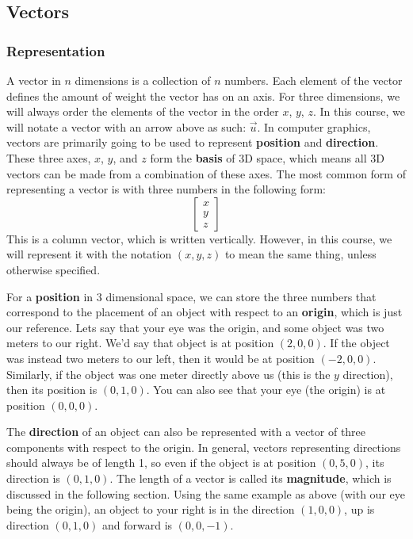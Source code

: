 \documentclass[a4paper]{article}
\begin{document}
\subsection{Vectors}

\subsubsection{Representation}
A vector in $n$ dimensions is a collection of $n$ numbers. Each element of the vector defines the amount of weight the vector has on an axis. For three dimensions, we will always order the elements of the vector in the order $x$, $y$, $z$. In this course, we will notate a vector with an arrow above as such: $\vec u$. In computer graphics, vectors are primarily going to be used to represent \textbf{position} and \textbf{direction}. These three axes, $x$, $y$, and $z$ form the \textbf{basis} of 3D space, which means all 3D vectors can be made from a combination of these axes. The most common form of representing a vector is with three numbers in the following form:
\[
\begin{bmatrix}
x \\
y \\
z 
\end{bmatrix}
\]
This is a column vector, which is written vertically. However, in this course, we will represent it with the notation $(x, y, z)$ to mean the same thing, unless otherwise specified.

For a \textbf{position} in 3 dimensional space, we can store the three numbers that correspond to the placement of an object with respect to an \textbf{origin}, which is just our reference. Lets say that your eye was the origin, and some object was two meters to our right. We'd say that object is at position $(2, 0, 0)$. If the object was instead two meters to our left, then it would be at position $(-2, 0, 0)$. Similarly, if the object was one meter directly above us (this is the $y$ direction), then its position is $(0, 1, 0)$. You can also see that your eye (the origin) is at position $(0, 0, 0)$.

The \textbf{direction} of an object can also be represented with a vector of three components with respect to the origin. In general, vectors representing directions should always be of length 1, so even if the object is at position $(0, 5, 0)$, its direction is $(0, 1, 0)$. The length of a vector is called its \textbf{magnitude}, which is discussed in the following section. Using the same example as above (with our eye being the origin), an object to your right is in the direction $(1, 0, 0)$, up is direction $(0, 1, 0)$ and forward is $(0, 0, -1)$.
\end{document}
